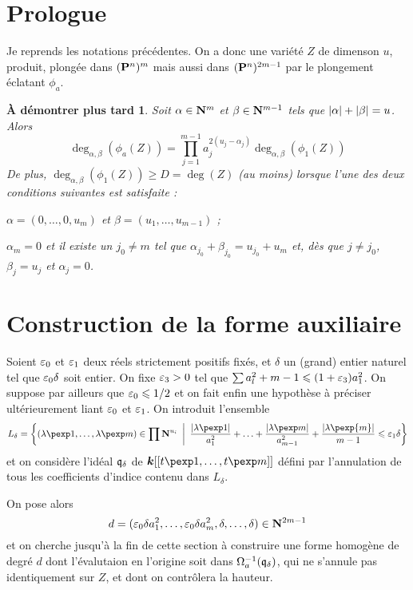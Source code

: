 \documentclass[11pt, twoside, a4paper, draft]{article}
\newtheorem*{flemme}{À démontrer plus tard}
\theoremstyle{definition}
\begin{document}
\section*{Prologue}

Je reprends les notations précédentes.  On a donc une variété $Z$ de dimenson
$u$, produit, plongée dans $(\mathbf{P}^n)^m$ mais aussi dans $(\mathbf{P}^n)^{2m-1}$ par
le plongement \og éclatant \fg{} $\phi_a$. 

\begin{flemme}
  Soit $\alpha \in \mathbf{N}^m$ et $\beta \in \mathbf{N}^{m-1}$ tels que ${\lvert\alpha\rvert} +
  {\lvert\beta\rvert} = u$. Alors
  \[
    \deg_{\alpha, \beta}(\phi_a(Z))= \prod_{j=1}^{m-1} a_j^{2(u_j - \alpha_j)}
    \deg_{\alpha, \beta}(\phi_1(Z))
  \]
  De plus, $\deg_{\alpha, \beta}(\phi_1(Z)) \ge D = \deg(Z)$ (au moins) lorsque
  l'une des deux conditions suivantes est satisfaite :
  \begin{enumthm}
    \item $\alpha = (0, \ldots, 0, u_m)$ et $\beta = (u_1, \ldots, u_{m-1})$ ;
    \item $\alpha_m = 0$ et il existe un $j_0 \neq m$ tel que $\alpha_{j_0} +
      \beta_ {j_0} = u_{j_0} + u_m$ et, dès que $j \neq j_0$, $\beta_j = u_j$ et
      $\alpha_j = 0$.
  \end{enumthm}
\end{flemme}

\section{Construction de la forme auxiliaire}

Soient $\varepsilon_0$ et $\varepsilon_1$ deux réels strictement positifs fixés, et $\delta$
un (grand) entier naturel tel que $\varepsilon_0 \delta$ soit entier. On fixe $\varepsilon_3 >
0$ tel que $\sum a_l^2 + m -1 \leqslant (1 + \varepsilon_3) a_1^2$. On suppose par ailleurs
que $\varepsilon_0 \leqslant 1/2$ et on fait enfin une hypothèse à préciser ultérieurement
liant $\varepsilon_0$ et $\varepsilon_1$. On introduit l'ensemble 
\[
  L_\delta = \left\{ (\lambda\pexp 1, \ldots, \lambda\pexp m) \in \prod \N^{u_i}
  \,\suchthat\, 
  \frac{\lgr{\lambda\pexp1}}{a_1^2} + \ldots +
  \frac{\lgr{\lambda\pexp m}}{a_{m-1}^2} + \frac{\lgr{\lambda\pexp{m}}}{m-1} 
  \le \eps_1 \delta \right\}
\]
et on considère l'idéal ${\mathfrak q}_\delta$ de $\cdn[[t\pexp1, \ldots, t\pexp m]]$
défini par l'annulation de tous les coefficients d'indice contenu dans
$L_\delta$. 

On pose alors 
\[
  d = (\varepsilon_0\delta a_1^2, \ldots, \varepsilon_0\delta a_m^2, \delta, \ldots, \delta)
  \in \mathbf{N}^{2m-1}
\]
et on cherche jusqu'à la fin de cette section à construire une forme homogène de
degré $d$ dont l'évalutaion en l'origine soit dans $\Omega_a^{-1}({\mathfrak q}_\delta)$,
qui ne s'annule pas identiquement sur $Z$, et dont on contrôlera la hauteur.
\end{document}
